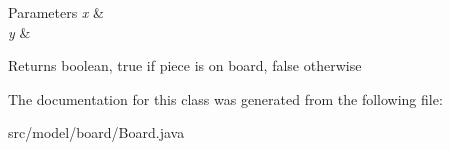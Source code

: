 \begin{DoxyParams}{Parameters}
{\em x} & \\
\hline
{\em y} & \\
\hline
\end{DoxyParams}
\begin{DoxyReturn}{Returns}
boolean, true if piece is on board, false otherwise 
\end{DoxyReturn}


The documentation for this class was generated from the following file\-:\begin{DoxyCompactItemize}
\item 
src/model/board/Board.\-java\end{DoxyCompactItemize}
